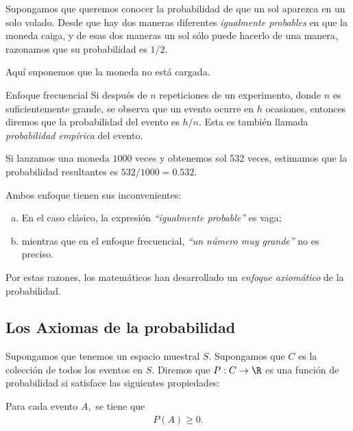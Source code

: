  \begin{ejemplo}
  \label{exmp:0.1.10}
  Supongamos que queremos conocer la probabilidad de que un sol aparezca en un solo volado.  Desde que hay dos maneras diferentes \emph{igualmente probables} en que la moneda caiga,  y de esas dos maneras un sol sólo puede hacerlo de una manera, razonamos que su probabilidad es $1/2.$
    

  \begin{rem}
   Aquí suponemos que la moneda no está cargada.
  \end{rem}

 \end{ejemplo}


{Enfoque frecuencial}
Si después de $n$ repeticiones de un experimento, donde $n$ es suficientemente grande, se observa que un evento ocurre en $h$ ocasiones, entonces diremos que la probabilidad del evento es $h/n.$  Esta es también llamada \emph{probabilidad empírica} del evento.

{}
\begin{ejemplo}
 \label{exmp:0.1.11}
 Si lanzamos una moneda $1000$ veces y obtenemos sol 532 veces, estimamos que la probabilidad resultantes es $532/1000=0.532$.
\end{ejemplo}



 \begin{rem}
  Ambos enfoque tienen sus inconvenientes:
  \begin{enumerate}[(a)]
   \item En el caso clásico, la expresión \emph{``igualmente probable''} es vaga; 
   \item mientras que en el enfoque frecuencial, \emph{``un número muy grande''} no es preciso. 
  \end{enumerate}
Por estas razones, los matemáticos han desarrollado un \emph{enfoque axiomático} de la probabilidad.
 \end{rem}


\subsection{Los Axiomas de la probabilidad}
{}
Supongamos que tenemos un espacio muestral $S.$ Supongamos que $C$ es la colección de todos los eventos en $S.$ Diremos que $P:C \to \R$ es una función de probabilidad si satisface las siguientes propiedades:



\begin{axiom}
   Para cada evento $A,$ se tiene que
   \begin{align}
   \label{eq:0.1.1}
    P(A)\geq 0.
   \end{align}

\end{axiom}



